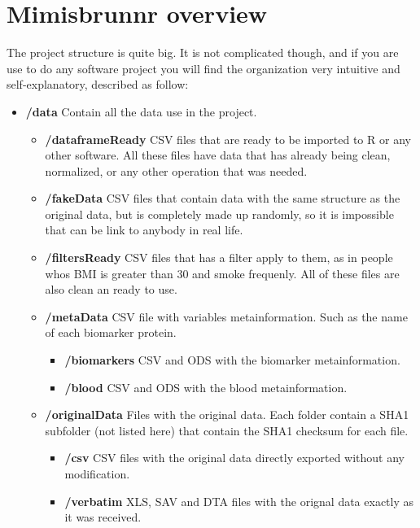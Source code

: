 \section{Mimisbrunnr overview}

The project structure is quite big. It is not complicated though, and if you are use to do any software project you will find the organization very intuitive and self-explanatory, described as follow:\vspace{3 mm}

\begin{itemize}

	\item[] \textbf{/data} Contain all the data use in the project.
    \begin{itemize}
    	\item[] \textbf{/dataframeReady} CSV files that are ready to be imported to R or any other software. All these files have data that has already being clean, normalized, or any other operation that was needed.
        \item[] \textbf{/fakeData} CSV files that contain data with the same structure as the original data, but is completely made up randomly, so it is impossible that can be link to anybody in real life.
        \item[] \textbf{/filtersReady} CSV files that has a filter apply to them, as in people whos BMI is greater than 30 and smoke frequenly. All of these files are also clean an ready to use.
        \item[] \textbf{/metaData} CSV file with variables metainformation. Such as the name of each biomarker protein.        
		    \begin{itemize}
                	\item[] \textbf{/biomarkers} CSV and ODS with the biomarker metainformation.
					\item[] \textbf{/blood} CSV and ODS with the blood metainformation.
			\end{itemize}
        \item[] \textbf{/originalData} Files with the original data. Each folder contain a SHA1 subfolder (not listed here) that contain the SHA1 checksum for each file.
		    \begin{itemize}
                	\item[] \textbf{/csv} CSV files with the original data directly exported without any modification.
					\item[] \textbf{/verbatim} XLS, SAV and DTA files with the orignal data exactly as it was received.
			\end{itemize}
	\end{itemize}  
	

\end{itemize}
